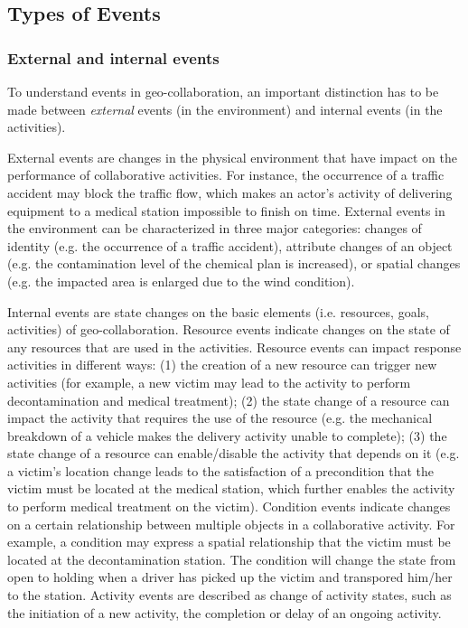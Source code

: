 \subsection{Types of Events} %
\label{sub:types_of_events}
\subsubsection{External and internal events} %
\label{ssub:external_and_internal_events}
To understand events in geo-collaboration, an important distinction has to be made between \emph{external} events (in the environment) and internal events (in the activities). 

External events are changes in the physical environment that have impact on the performance of collaborative activities. For instance, the occurrence of a traffic accident may block the traffic flow, which makes an actor’s activity of delivering equipment to a medical station impossible to finish on time. External events in the environment can be characterized in three major categories: changes of identity (e.g. the occurrence of a traffic accident), attribute changes of an object (e.g. the contamination level of the chemical plan is increased), or spatial changes (e.g. the impacted area is enlarged due to the wind condition).

Internal events are state changes on the basic elements (i.e. resources, goals, activities) of geo-collaboration. Resource events indicate changes on the state of any resources that are used in the activities. Resource events can impact response activities in different ways: (1) the creation of a new resource can trigger new activities (for example, a new victim may lead to the activity to perform decontamination and medical treatment); (2) the state change of a resource can impact the activity that requires the use of the resource (e.g. the mechanical breakdown of a vehicle makes the delivery activity unable to complete); (3) the state change of a resource can enable/disable the activity that depends on it (e.g. a victim’s location change leads to the satisfaction of a precondition that the victim must be located at the medical station, which further enables the activity to perform medical treatment on the victim). Condition events indicate changes on a certain relationship between multiple objects in a collaborative activity. For example, a condition may express a spatial relationship that the victim must be located at the decontamination station. The condition will change the state from open to holding when a driver has picked up the victim and transpored him/her to the station. Activity events are described as change of activity states, such as the initiation of a new activity, the completion or delay of an ongoing activity. 

